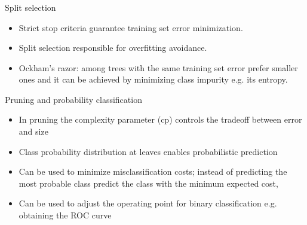 \documentclass[smaller, proffesionalfonts]{beamer}
\begin{document}
\begin{frame}
\small
\frametitle{}
\begin{block}{Split selection}
\begin{itemize}
\item Strict stop criteria guarantee training set error minimization.
\item Split selection responsible for overfitting avoidance.
\item Ockham's razor: among trees with the same training set error prefer smaller ones and it can be achieved by minimizing class impurity e.g. its entropy.
\end{itemize}
\end{block}
\begin{block}{Pruning and probability classification}
\begin{itemize}
\item In pruning the complexity parameter (cp) controls the tradeoff between error and size
\item Class probability distribution at leaves enables probabilistic prediction
\item Can be used to minimize misclassification costs; instead of predicting the most probable class predict the class with the minimum expected cost,
\item Can be used to adjust the operating point for binary classification e.g. obtaining the ROC curve
\end{itemize}
\end{block}
\end{frame}
\end{document}
